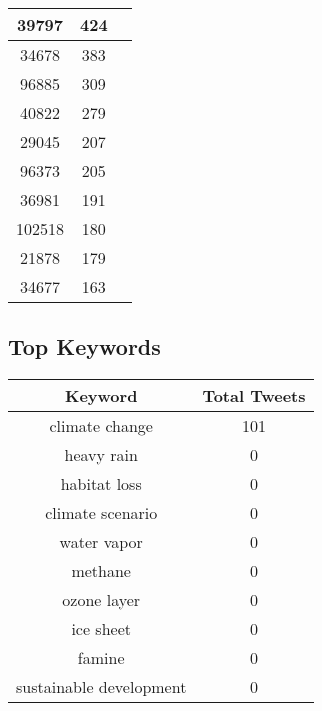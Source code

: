 \documentclass{article}\usepackage[T1]{fontenc}
\begin{document}
\begin{tabular}{|c|c|c|}
 \hline
39797 & 424\\ 
 \hline
34678 & 383\\ 
 \hline
96885 & 309\\ 
 \hline
40822 & 279\\ 
 \hline
29045 & 207\\ 
 \hline
96373 & 205\\ 
 \hline
36981 & 191\\ 
 \hline
102518 & 180\\ 
 \hline
21878 & 179\\ 
 \hline
34677 & 163\\ 
 \hline
\end{tabular}\subsection*{Top Keywords}\begin{tabular}{|c|c|}         \hline         Keyword & Total Tweets \\ 
 \hline
climate change & 101\\ 
 \hline
heavy rain & 0\\ 
 \hline
habitat loss & 0\\ 
 \hline
climate scenario & 0\\ 
 \hline
water vapor & 0\\ 
 \hline
methane & 0\\ 
 \hline
ozone layer & 0\\ 
 \hline
ice sheet & 0\\ 
 \hline
famine & 0\\ 
 \hline
sustainable development & 0\\ 
 \hline
\end{tabular}
\end{document}
